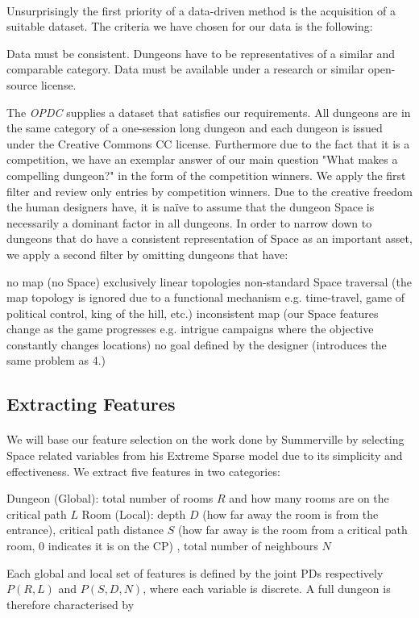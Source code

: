 \documentclass{UoYCSproject}
\begin{document}
\paragraph{}
Unsurprisingly the first priority of a data-driven method is the acquisition of a suitable dataset. The criteria we have chosen for our data is the following:
\begin{outline}[enumerate]
  \1 Data must be consistent. Dungeons have to be representatives of a similar and comparable category.
  \1 Data must be available under a research or similar open-source license.
\end{outline}
The \textit{OPDC} supplies a dataset that satisfies our requirements. All dungeons are in the same category of a one-session long dungeon and each dungeon is issued under the Creative Commons CC license. Furthermore due to the fact that it is a competition, we have an exemplar answer of our main question "What makes a compelling dungeon?" in the form of the competition winners. We apply the first filter and review only entries by competition winners. Due to the creative freedom the human designers have, it is na\"{i}ve to assume that the dungeon Space is necessarily a dominant factor in all dungeons. In order to narrow down to dungeons that do have a consistent representation of Space as an important asset, we apply a second filter by omitting dungeons that have:
\begin{outline}[enumerate]
  \1 no map (no Space)
  \1 exclusively linear topologies
  \1 non-standard Space traversal (the map topology is ignored due to a functional mechanism e.g. time-travel, game of political control, king of the hill, etc.)
  \1 inconsistent map (our Space features change as the game progresses e.g. intrigue campaigns where the objective constantly changes locations)
  \1 no goal defined by the designer (introduces the same problem as 4.)
\end{outline}

\subsection{Extracting Features}
\label{subsec:feature_extraction}
\paragraph{}
We will base our feature selection on the work done by Summerville \parencite{SummervilleSamplingHyrule} by selecting Space related variables from his Extreme Sparse model due to its simplicity and effectiveness. We extract five features in two categories: 
\begin{outline}[enumerate]
  \1 Dungeon (Global): total number of rooms \(R\) and how many rooms are on the critical path \(L\)
  \1 Room (Local): depth \(D\) (how far away the room is from the entrance), critical path distance \(S\) (how far away is the room from a critical path room, 0 indicates it is on the CP) , total number of neighbours \(N\)
\end{outline}
Each global and local set of features is defined by the joint PDs respectively \(P(R, L)\) and \(P(S, D, N)\), where each variable is discrete. A full dungeon is therefore characterised by 
\end{document}
